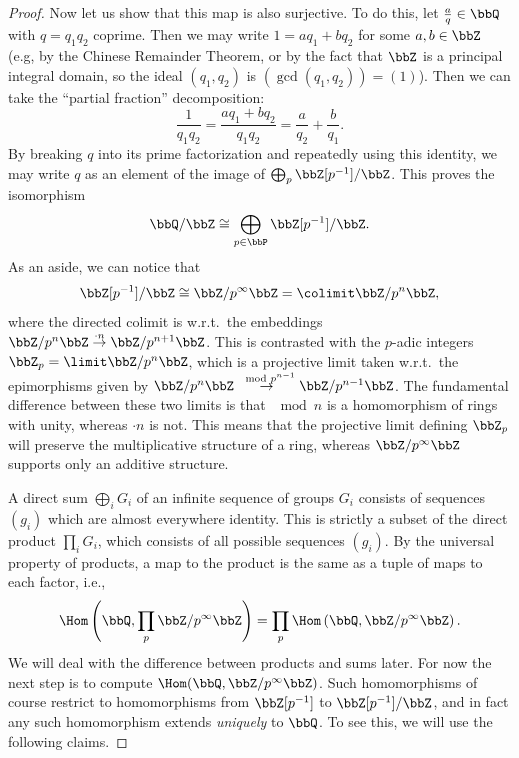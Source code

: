 \begin{proof}
    Now let us show that this map is also surjective. To do this, let $\frac aq\in\bbQ$ with $q=q_1q_2$ coprime. Then we may write $1=aq_1+bq_2$ for some $a,b\in\bbZ$ (e.g, by the Chinese Remainder Theorem, or by the fact that $\bbZ$ is a principal integral domain, so the ideal $(q_1,q_2)$ is $(\gcd(q_1,q_2))=(1)$). Then we can take the ``partial fraction'' decomposition:
    \[\frac{1}{q_1q_2}=\frac{aq_1+bq_2}{q_1q_2}=\frac{a}{q_2}+\frac{b}{q_1}.\]
    By breaking $q$ into its prime factorization and repeatedly using this identity, we may write $q$ as an element of the image of $\bigoplus_p \bbZ[p^{-1}]\slash\bbZ$. This proves the isomorphism 
    \[\bbQ\slash \bbZ\cong \bigoplus_{p\in\bbP}\bbZ[p^{-1}]\slash\bbZ.\]
    As an aside, we can notice that 
    \[\bbZ[p^{-1}]\slash\bbZ\cong \bbZ\slash p^\infty\bbZ=\colimit \bbZ\slash p^n\bbZ,\]
    where the directed colimit is w.r.t.\ the embeddings $\bbZ\slash p^n\bbZ\overset{\cdot n}{\to} \bbZ\slash p^{n+1}\bbZ$. This is contrasted with the $p$-adic integers $\bbZ_p=\limit \bbZ\slash p^n\bbZ$, which is a projective limit taken w.r.t.\ the epimorphisms given by $\bbZ\slash p^n\bbZ\overset{\mod p^{n-1}}{\to} \bbZ\slash p^{n-1}\bbZ$. The fundamental difference between these two limits is that $\mod n$ is a homomorphism of rings with unity, whereas $\cdot n$ is not. This means that the projective limit defining $\bbZ_p$ will preserve the multiplicative structure of a ring, whereas $\bbZ\slash p^\infty\bbZ$ supports only an additive structure.

    A direct sum $\bigoplus_i G_i$ of an infinite sequence of groups $G_i$ consists of sequences $(g_i)$ which are almost everywhere identity. This is strictly a subset of the direct product $\prod_i G_i$, which consists of all possible sequences $(g_i)$. By the universal property of products, a map to the product is the same as a tuple of maps to each factor, i.e., 
    \[\Hom\left(\bbQ,\prod_p \bbZ\slash p^\infty\bbZ\right)=\prod_p \Hom\left(\bbQ,\bbZ\slash p^\infty\bbZ\right).\]
    We will deal with the difference between products and sums later. For now the next step is to compute $\Hom(\bbQ,\bbZ\slash p^{\infty}\bbZ)$.  Such homomorphisms of course restrict to homomorphisms from $\bbZ[p^{-1}]$ to $\bbZ[p^{-1}]\slash \bbZ$, and in fact any such homomorphism extends \emph{uniquely} to $\bbQ$. To see this, we will use the following claims.


\end{proof}
